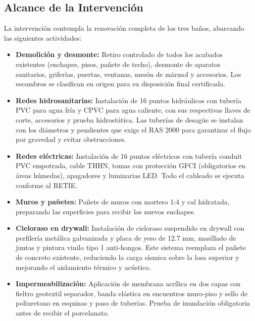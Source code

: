 ﻿\documentclass[12pt]{article}
\begin{document}
\subsection{Alcance de la Intervención}

La intervención contempla la renovación completa de los tres baños, abarcando las siguientes actividades:

\begin{itemize}[noitemsep]
  \item {\bfseries Demolición y desmonte:} Retiro controlado de todos los acabados existentes (enchapes, pisos, pañete de techo), desmonte de aparatos sanitarios, griferías, puertas, ventanas, mesón de mármol y accesorios. Los escombros se clasifican en origen para su disposición final certificada.

  \item {\bfseries Redes hidrosanitarias:} Instalación de 16 puntos hidráulicos con tubería PVC para agua fría y CPVC para agua caliente, con sus respectivas llaves de corte, accesorios y prueba hidrostática. Las tuberías de desagüe se instalan con los diámetros y pendientes que exige el RAS 2000 para garantizar el flujo por gravedad y evitar obstrucciones.

  \item {\bfseries Redes eléctricas:} Instalación de 16 puntos eléctricos con tubería conduit PVC empotrada, cable THHN, tomas con protección GFCI (obligatorios en áreas húmedas), apagadores y luminarias LED. Todo el cableado se ejecuta conforme al RETIE.

  \item {\bfseries Muros y pañetes:} Pañete de muros con mortero 1:4 y cal hidratada, preparando las superficies para recibir los nuevos enchapes.

  \item {\bfseries Cieloraso en drywall:} Instalación de cieloraso suspendido en drywall con perfilería metálica galvanizada y placa de yeso de 12.7 mm, masillado de juntas y pintura vinilo tipo 1 anti-hongos. Este sistema reemplaza el pañete de concreto existente, reduciendo la carga sísmica sobre la losa superior y mejorando el aislamiento térmico y acústico.

  \item {\bfseries Impermeabilización:} Aplicación de membrana acrílica en dos capas con fieltro geotextil separador, banda elástica en encuentros muro-piso y sello de poliuretano en esquinas y paso de tuberías. Prueba de inundación obligatoria antes de recibir el porcelanato.


\end{itemize}
\end{document}

